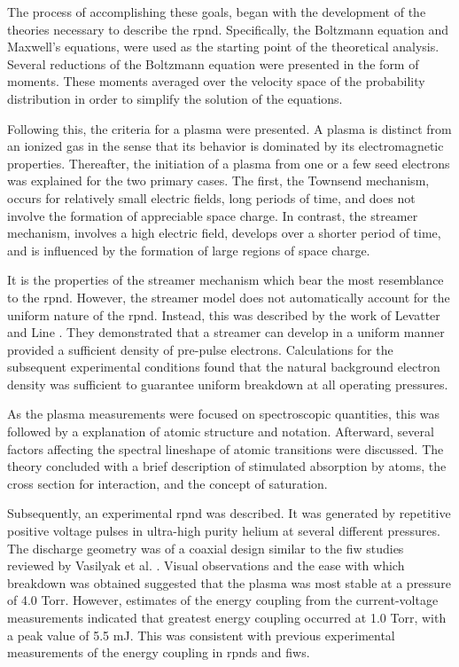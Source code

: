 The process of accomplishing these goals, began with the development of the
theories necessary to describe the \acs{rpnd}. Specifically, the Boltzmann
equation and Maxwell's equations, were used as the starting point of the
theoretical analysis. Several reductions of the Boltzmann equation were
presented in the form of moments. These moments averaged over the velocity space
of the probability distribution in order to simplify the solution of the
equations.

Following this, the criteria for a plasma were presented. A plasma is distinct
from an ionized gas in the sense that its behavior is dominated by its
electromagnetic properties. Thereafter, the initiation of a plasma from one or a
few seed electrons was explained for the two primary cases. The first, the
Townsend mechanism, occurs for relatively small electric fields, long periods of
time, and does not involve the formation of appreciable space charge. In
contrast, the streamer mechanism, involves a high electric field, develops over
a shorter period of time, and is influenced by the formation of large regions of
space charge.

It is the properties of the streamer mechanism which bear the most resemblance
to the \acs{rpnd}. However, the streamer model does not automatically account
for the uniform nature of the \acs{rpnd}. Instead, this was described by the
work of Levatter and Line \cite{Levatter1980}. They demonstrated that a streamer
can develop in a uniform manner provided a sufficient density of pre-pulse
electrons. Calculations for the subsequent experimental conditions found that
the natural background electron density was sufficient to guarantee uniform
breakdown at all operating pressures.

As the plasma measurements were focused on spectroscopic quantities, this was
followed by a explanation of atomic structure and notation. Afterward, several
factors affecting the spectral lineshape of atomic transitions were discussed.
The theory concluded with a brief description of stimulated absorption by atoms,
the cross section for interaction, and the concept of saturation.

Subsequently, an experimental \acs{rpnd} was described. It was generated by
repetitive positive voltage pulses in ultra-high purity helium at several
different pressures. The discharge geometry was of a coaxial design similar to
the \acs{fiw} studies reviewed by Vasilyak et al. \cite{Vasilyak1994}. Visual
observations and the ease with which breakdown was obtained suggested that the
plasma was most stable at a pressure of 4.0 Torr. However, estimates of the
energy coupling from the current-voltage measurements indicated that greatest
energy coupling occurred at 1.0 Torr, with a peak value of 5.5 mJ. This was
consistent with previous experimental measurements of the energy coupling in
\acs{rpnd}s and \acs{fiw}s.

